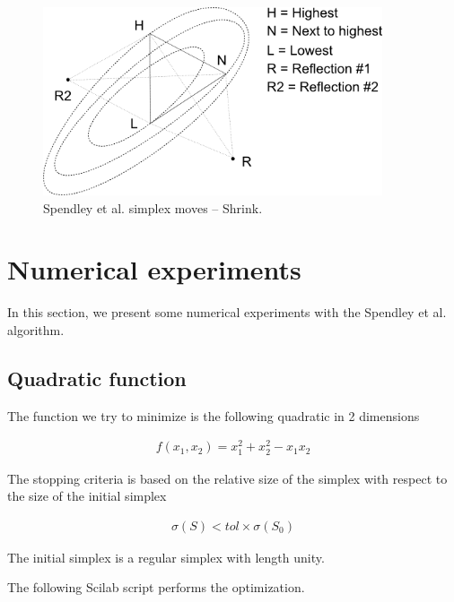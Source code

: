 \begin{figure}
\begin{center}
\includegraphics[width=10cm]{spendley-steps-shrink.png}
\end{center}
\caption{Spendley et al. simplex moves -- Shrink.}
\label{fig-spendley-moves-shrink}
\end{figure}



\section{Numerical experiments}

In this section, we present some numerical experiments 
with the Spendley et al. algorithm.

\subsection{Quadratic function}

The function we try to minimize is the following quadratic 
in 2 dimensions 

\begin{eqnarray}
f(x_1,x_2) = x_1^2 + x_2^2 - x_1 x_2
\end{eqnarray}

The stopping criteria is based on the relative size of the simplex 
with respect to the size of the initial simplex 

\begin{eqnarray}
\sigma(S) < tol \times \sigma(S_0)
\end{eqnarray}

The initial simplex is a regular simplex with length unity.

The following Scilab script performs the optimization.

